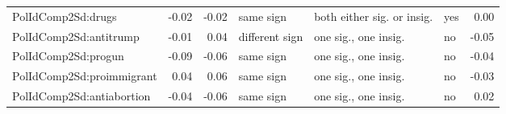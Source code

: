 \begin{table}[!h]
\begin{tabular}[t]{lrrlllr}
\cmidrule{1-7}
PolIdComp2Sd:drugs & -0.02 & -0.02 & same sign & both either sig. or insig. & yes & 0.00\\
\cmidrule{1-7}
PolIdComp2Sd:antitrump & -0.01 & 0.04 & different sign & one sig., one insig. & no & -0.05\\
\cmidrule{1-7}
PolIdComp2Sd:progun & -0.09 & -0.06 & same sign & one sig., one insig. & no & -0.04\\
\cmidrule{1-7}
PolIdComp2Sd:proimmigrant & 0.04 & 0.06 & same sign & one sig., one insig. & no & -0.03\\
\cmidrule{1-7}
PolIdComp2Sd:antiabortion & -0.04 & -0.06 & same sign & one sig., one insig. & no & 0.02\\
\bottomrule
\end{tabular}
\end{table}
